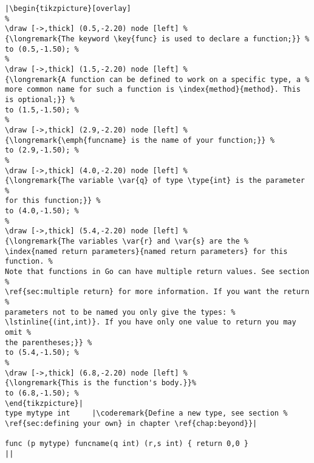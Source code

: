 \begin{lstlisting}[caption=A function declaration,label=src:function definition]
|\begin{tikzpicture}[overlay]
%
\draw [->,thick] (0.5,-2.20) node [left] %
{\longremark{The keyword \key{func} is used to declare a function;}} %
to (0.5,-1.50); %
%
\draw [->,thick] (1.5,-2.20) node [left] %
{\longremark{A function can be defined to work on a specific type, a %
more common name for such a function is \index{method}{method}. This is optional;}} %
to (1.5,-1.50); %
%
\draw [->,thick] (2.9,-2.20) node [left] %
{\longremark{\emph{funcname} is the name of your function;}} %
to (2.9,-1.50); %
%
\draw [->,thick] (4.0,-2.20) node [left] %
{\longremark{The variable \var{q} of type \type{int} is the parameter %
for this function;}} %
to (4.0,-1.50); %
%
\draw [->,thick] (5.4,-2.20) node [left] %
{\longremark{The variables \var{r} and \var{s} are the %
\index{named return parameters}{named return parameters} for this function. %
Note that functions in Go can have multiple return values. See section %
\ref{sec:multiple return} for more information. If you want the return %
parameters not to be named you only give the types: %
\lstinline{(int,int)}. If you have only one value to return you may omit %
the parentheses;}} %
to (5.4,-1.50); %
%
\draw [->,thick] (6.8,-2.20) node [left] %
{\longremark{This is the function's body.}}%
to (6.8,-1.50); %
\end{tikzpicture}|
type mytype int	    |\coderemark{Define a new type, see section %
\ref{sec:defining your own} in chapter \ref{chap:beyond}}|

func (p mytype) funcname(q int) (r,s int) { return 0,0 }
||
\end{lstlisting}
